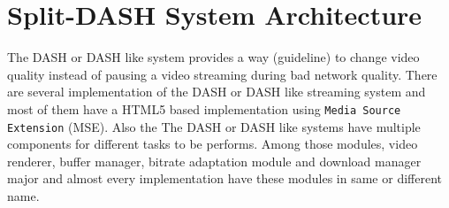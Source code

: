 \section{Split-DASH System Architecture}
The DASH or DASH like system provides a way (guideline) to change video quality instead of pausing a video streaming during bad network quality. There are several implementation of the DASH or DASH like streaming system and most of them have a HTML5 based implementation using {\tt Media Source Extension} (MSE). Also the 
The DASH or DASH like systems have multiple components for different tasks to be performs. Among those modules, video renderer, buffer manager, bitrate adaptation module and download manager major and almost every implementation have these modules in same or different name. 
